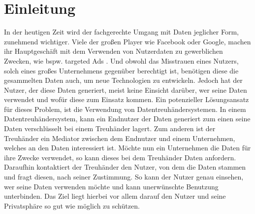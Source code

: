 \documentclass[11pt,a4paper]{scrreprt}
\begin{document}
\chapter{Einleitung}
In der heutigen Zeit wird der fachgerechte Umgang mit Daten jeglicher Form, zunehmend wichtiger. Viele der großen Player wie Facebook oder Google, machen ihr Hauptgeschäft mit dem Verwenden von Nutzerdaten zu gewerblichen Zwecken, wie bspw. targeted Ads \cite{facebookad} \cite{googlead}. Und obwohl das Misstrauen eines Nutzers, solch eines großes Unternehmens gegenüber berechtigt ist, benötigen diese die gesammelten Daten auch, um neue Technologien zu entwickeln. Jedoch hat der Nutzer, der diese Daten generiert, meist keine Einsicht darüber, wer seine Daten verwendet und wofür diese zum Einsatz kommen. Ein potenzieller Lösungsansatz für dieses Problem, ist die Verwendung von Datentreuhändersystemen. In einem Datentreuhändersystem, kann ein Endnutzer der Daten generiert zum einen seine Daten verschlüsselt bei einem Treuhänder lagert. Zum anderen ist der Treuhänder ein Mediator zwischen dem Endnutzer und einem Unternehmen, welches an den Daten interessiert ist. Möchte nun ein Unternehmen die Daten für ihre Zwecke verwendet, so kann dieses bei dem Treuhänder Daten anfordern. Daraufhin kontaktiert der Treuhänder den Nutzer, von dem die Daten stammen und fragt diesen, nach seiner Zustimmung. So kann der Nutzer genau einsehen, wer seine Daten verwenden möchte und kann unerwünschte Benutzung unterbinden. Das Ziel liegt hierbei vor allem darauf den Nutzer und seine Privatsphäre so gut wie möglich zu schützen.
\end{document}
